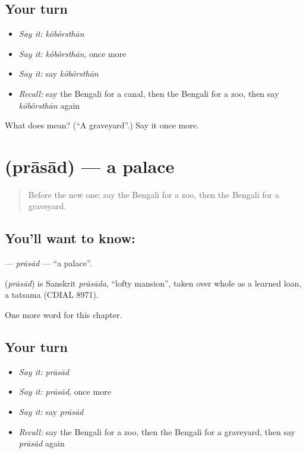 \subsection*{Your turn}
\begin{itemize}
\raggedright
  \item \emph{Say it:} \emph{kôbôrsthān}
  \item \emph{Say it:} \emph{kôbôrsthān}, once more
  \item \emph{Say it:} say \emph{kôbôrsthān}
  \item \emph{Recall:} say the Bengali for a canal, then the Bengali for a zoo, then say \emph{kôbôrsthān} again
\end{itemize}

\begin{tcolorbox}[breakable,colback=teal!4,colframe=teal!35!black,title={Before you move on}]
What does  mean? (\textquotedblleft{}A graveyard\textquotedblright{}.) Say it once more.
\end{tcolorbox}
\section[\texorpdfstring{\bn{প্রাসাদ} (prāsād)}{প্রাসাদ (prāsād)}]{ (prāsād) — a palace}

\label{lesson:BN-C158-prasad}



\begin{quote}
Before the new one: say the Bengali for a zoo, then the Bengali for a graveyard.
\end{quote}

\subsection*{You'll want to know: }
\textbf{} — \emph{prāsād} — \textquotedblleft{}a palace\textquotedblright{}.

\begin{cousinweb}
\textbf{} (\emph{prāsād}) is Sanskrit \emph{prāsāda}, \textquotedblleft{}lofty mansion\textquotedblright{}, taken over whole as a learned loan, a tatsama (CDIAL 8971).
\end{cousinweb}

\begin{grammarlens}[title={What you've built}]
One more word for this chapter.
\end{grammarlens}

\subsection*{Your turn}
\begin{itemize}
\raggedright
  \item \emph{Say it:} \emph{prāsād}
  \item \emph{Say it:} \emph{prāsād}, once more
  \item \emph{Say it:} say \emph{prāsād}
  \item \emph{Recall:} say the Bengali for a zoo, then the Bengali for a graveyard, then say \emph{prāsād} again
\end{itemize}


